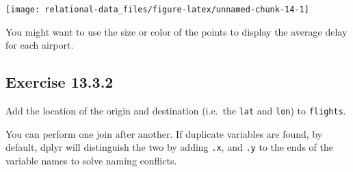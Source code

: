 \documentclass[]{book}
\newenvironment{Shaded}{\begin{snugshade}}{\end{snugshade}}
\newcommand{\CommentTok}[1]{\textcolor[rgb]{0.56,0.35,0.01}{\textit{#1}}}
\newcommand{\DataTypeTok}[1]{\textcolor[rgb]{0.13,0.29,0.53}{#1}}
\newcommand{\KeywordTok}[1]{\textcolor[rgb]{0.13,0.29,0.53}{\textbf{#1}}}
\newcommand{\NormalTok}[1]{#1}
\newcommand{\OperatorTok}[1]{\textcolor[rgb]{0.81,0.36,0.00}{\textbf{#1}}}
\newcommand{\OtherTok}[1]{\textcolor[rgb]{0.56,0.35,0.01}{#1}}
\newcommand{\StringTok}[1]{\textcolor[rgb]{0.31,0.60,0.02}{#1}}
\theoremstyle{plain}
\theoremstyle{remark}
\theoremstyle{definition}
\theoremstyle{definition}
\theoremstyle{definition}
\theoremstyle{remark}
\begin{document}
\begin{Shaded}
\end{Shaded}

\begin{center}\texttt{[image: relational-data\_files/figure-latex/unnamed-chunk-14-1]} \end{center}

You might want to use the size or color of the points to display the
average delay for each airport.

\hypertarget{exercise-13.3.2}{%
\subsection*{\texorpdfstring{Exercise
{13.3.2}}{Exercise 13.3.2}}\label{exercise-13.3.2}}

Add the location of the origin and destination (i.e.~the \texttt{lat}
and \texttt{lon}) to \texttt{flights}.

You can perform one join after another. If duplicate variables are
found, by default, dplyr will distinguish the two by adding \texttt{.x},
and \texttt{.y} to the ends of the variable names to solve naming
conflicts.
\end{document}

